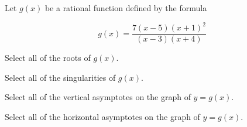 \documentclass{ximera}
\author{Lee Wayand}
\begin{document}
\begin{exercise}




Let $g(x)$ be a rational function defined by the formula

\[
g(x) = \frac{7(x-5)(x+1)^2}{(x-3)(x+4)}
\]


\begin{question}


Select all of the roots of $g(x)$.

\begin{selectAll}
\end{selectAll}

\end{question}






\begin{question}


Select all of the singularities of $g(x)$.

\begin{selectAll}
\end{selectAll}

\end{question}










\begin{question}


Select all of the vertical asymptotes on the graph of $y = g(x)$.

\begin{selectAll}
\end{selectAll}

\end{question}












\begin{question}


Select all of the horizontal asymptotes on the graph of $y = g(x)$.

\begin{selectAll}
\end{selectAll}


\end{question}
\end{exercise}
\end{document}
